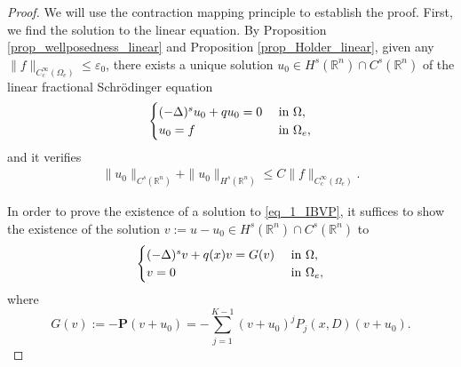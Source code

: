 \documentclass [oneside,11pt] {amsart}
\numberwithin{equation}{section}
\newcommand{\R}{\mathbb{R}}
\begin{document}
\begin{proof}
We will use the contraction mapping principle to establish the proof. 
First, we find the solution to the linear equation. By Proposition \ref{prop_wellposedness_linear} and Proposition \ref{prop_Holder_linear}, given any $\|f\|_{C^\infty_c(\Omega_e)}\leq \varepsilon_0$, there exists a unique solution $u_0\in H^s(\R^n)\cap C^s(\R^n)$ of the linear fractional Schr\"odinger equation
\[
\begin{cases}
(-\Delta)^s u_0 + q u_0 = 0 &\hbox{ in } \Omega,\\
u_0 = f &\hbox{ in } \Omega_e,
\end{cases}
\]
and it verifies
\begin{align}\label{eq_wellpose_pf_u0_est}
\|u_0\|_{C^{s}(\R^n)}+\|u_0\|_{H^s(\R^n)} 
\le C \|f\|_{C_c^{\infty}(\Omega_e)}.
\end{align}

In order to prove the existence of a solution to \eqref{eq_1_IBVP}, it suffices to show the existence of the solution $v := u- u_0\in H^s(\R^n)\cap C^{s}(\R^n)$ to
\begin{align}\label{eq_wellpose_pf_v}
\begin{cases}
(-\Delta)^sv + q (x)v= G(v)&\hbox{ in } \Omega,\\
v = 0 & \hbox{ in } \Omega_e, 
\end{cases}
\end{align}
where 
\[
G(v) := -\mathbf{P}(v+u_0)=- \sum^{K-1}_{j=1}(v+u_0)^j P_j(x,D)(v+u_0). 
\]


\end{proof}
\end{document}
